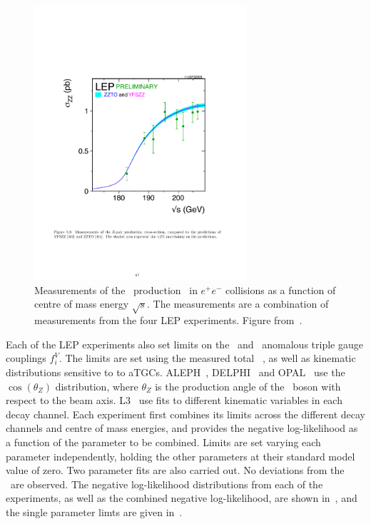 \begin{figure}
\centering
        \includegraphics[width=0.7\textwidth]{lep_cx}
    \caption{Measurements of the \ZZ\ production \cx\ in  $e^+e^-$
    collisions as a function of centre of mass energy $\sqrt{s}$. The
    measurements are a combination of measurements from the four LEP
    experiments. Figure from~\cite{bib:LEPEW2006}.}
    \label{fig:lep-cx}
\end{figure}

Each of the LEP experiments also set limits on the \ZZZ\ and \ZZg\ anomalous
triple gauge couplings $f_{i}^{V}$. The limits are set using the measured total
\ZZ\ \cx, as well as kinematic distributions sensitive to to aTGCs.
ALEPH~\cite{Schael:1166743}, DELPHI~\cite{Bambade:1002930} and
OPAL~\cite{Abbiendi:2000kq} use the $\cos(\theta_{Z})$ distribution, where
$\theta_{Z}$ is the production angle of the \Z\ boson with respect to the beam
axis. L3~\cite{Acciarri:1999ug} use fits to different kinematic variables in
each decay channel. Each experiment first combines its limits across the different
decay channels and centre of mass energies, and provides the negative
log-likelihood as a function of the parameter to be combined. Limits are set
varying each parameter independently, holding the other parameters at their
standard model value of zero. Two parameter
fits are also carried out. No deviations from the \sm\ are observed. The
negative log-likelihood distributions from each of the experiments, as well as the
combined negative log-likelihood, are shown in~, and the single
parameter limts are given in~.

